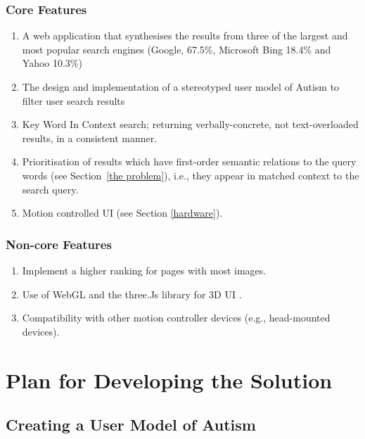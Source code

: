 \documentclass[a4paper, 11pt]{article}
\begin{document}
\subsubsection{Core Features}
\begin{enumerate}
\item  A web application that synthesises the results from three of the largest and most popular search engines (Google, 67.5\%, Microsoft Bing 18.4\% and Yahoo 10.3\%) \cite{adam}

\item The design and implementation of a stereotyped user model of Autism to filter user search results

\item Key Word In Context search; returning verbally-concrete, not text-overloaded results, in a consistent manner. 

\item Prioritisation of results which have first-order semantic relations to the query words (see Section~\ref{the problem}), i.e., they appear in matched context to the search query.

\item Motion controlled UI (see Section \ref{hardware}).
\end{enumerate}

\subsubsection{Non-core Features}
\begin{enumerate}

\item Implement a higher ranking for pages with most images. 
\item Use of WebGL and the three.Js library for 3D UI .
\item Compatibility with other motion controller devices (e.g., head-mounted devices).

\end{enumerate}

\section{Plan for Developing the Solution}

\subsection {Creating a User Model of Autism}\label{usermodel}
\end{document}
